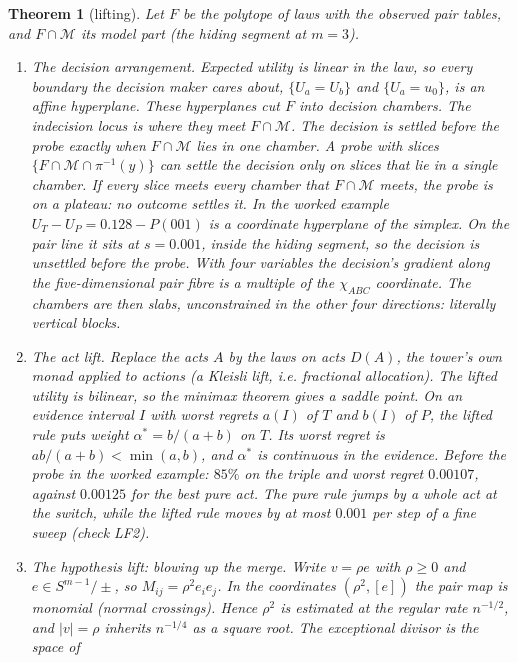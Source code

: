\documentclass[11pt]{article}
\newtheorem{theorem}{Theorem}\renewcommand{\thetheorem}{\Alph{theorem}}
\theoremstyle{definition}\newtheorem{definition}{Definition}\newtheorem{remark}{Remark}
\begin{document}
\begin{theorem}[lifting]\label{thm:K}
Let $F$ be the polytope of laws with the observed pair tables, and $F\cap\mathcal M$ its model part (the hiding segment at $m=3$).
\begin{enumerate}
\item[(1)] \emph{The decision arrangement.} Expected utility is linear in the law, so every boundary the decision maker cares about,
  $\{U_a=U_b\}$ and $\{U_a=u_0\}$, is an affine hyperplane. These hyperplanes cut $F$ into \emph{decision chambers}. The \emph{indecision
  locus} is where they meet $F\cap\mathcal M$. The decision is settled before the probe exactly when $F\cap\mathcal M$ lies in one
  chamber. A probe with slices $\{F\cap\mathcal M\cap\pi^{-1}(y)\}$ can settle the decision only on slices that lie in a single
  chamber. If every slice meets every chamber that $F\cap\mathcal M$ meets, the probe is on a \emph{plateau}: no outcome settles it.
  In the worked example $U_T-U_P=0.128-P(001)$ is a coordinate hyperplane of the simplex. On the pair line it sits at $s=0.001$,
  inside the hiding segment, so the decision is unsettled before the probe. With four variables the decision's gradient along the
  five-dimensional pair fibre is a multiple of the $\chi_{ABC}$ coordinate. The chambers are then \emph{slabs}, unconstrained in the
  other four directions: literally vertical blocks.
\item[(2)] \emph{The act lift.} Replace the acts $A$ by the laws on acts $D(A)$, the tower's own monad applied to actions (a Kleisli lift,
  i.e. fractional allocation). The lifted utility is bilinear, so the minimax theorem gives a saddle point. On an evidence interval
  $I$ with worst regrets $a(I)$ of $T$ and $b(I)$ of $P$, the lifted rule puts weight $\alpha^*=b/(a+b)$ on $T$. Its worst regret is
  $ab/(a+b)<\min(a,b)$, and $\alpha^*$ is continuous in the evidence. Before the probe in the worked example: $85\%$ on the triple and
  worst regret $0.00107$, against $0.00125$ for the best pure act. The pure rule jumps by a whole act at the switch, while the lifted
  rule moves by at most $0.001$ per step of a fine sweep (check LF2).
\item[(3)] \emph{The hypothesis lift: blowing up the merge.} Write $v=\rho e$ with $\rho\ge0$ and $e\in S^{m-1}/\pm$, so
  $M_{ij}=\rho^2e_ie_j$. In the coordinates $(\rho^2,[e])$ the pair map is monomial (normal crossings). Hence $\rho^2$ is estimated at
  the regular rate $n^{-1/2}$, and $|v|=\rho$ inherits $n^{-1/4}$ as a square root. The exceptional divisor is the space of

\end{enumerate}
\end{theorem}
\end{document}
